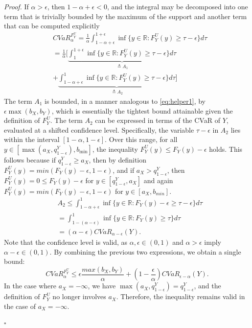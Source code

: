 \documentclass[letterpaper]{article} %
\newenvironment{proof}{\noindent\textit{Proof.}}{\hfill$\square$}
\begin{document}
\begin{proof}
	If $\alpha > \epsilon$, then $1 - \alpha + \epsilon < 0$, and the integral may be decomposed into one term that is trivially bounded by the maximum of the support and another term that can be computed explicitly
	\begin{equation}
		\begin{aligned}
			&CVaR_\alpha^{F_Y^U}=\frac{1}{\alpha}\int_{1-\alpha+\epsilon}^{1+\epsilon} \inf \{y\in \mathbb{R}:F_Y^U(y)\geq \tau -\epsilon\} d\tau \\
			&=\frac{1}{\alpha}[\underbrace{\int_{1}^{1+\epsilon} \inf \{y\in \mathbb{R}:F_Y^U(y)\geq \tau -\epsilon\} d\tau}_{\triangleq A_1} \\
			&+\underbrace{\int_{1-\alpha+\epsilon}^{1} \inf \{y\in \mathbb{R}:F_Y^U(y)\geq \tau -\epsilon\} d\tau}_{\triangleq A_2}]
		\end{aligned}
	\end{equation}
	The term $A_1$ is bounded, in a manner analogous to \eqref{eq:helper1}, by $\epsilon \max(b_X, b_Y)$, which is essentially the tightest bound attainable given the definition of $F_Y^U$. The term $A_2$ can be expressed in terms of the CVaR of $Y$, evaluated at a shifted confidence level. Specifically, the variable $\tau - \epsilon$ in $A_2$ lies within the interval $[1 - \alpha, 1 - \epsilon]$. Over this range, for all $y \in [\max(a_X, q_{1-\epsilon}^Y), b_{\min}]$, the inequality $F_Y^U(y) \leq F_Y(y) - \epsilon$ holds. This follows because if $q_{1-\epsilon}^Y \geq a_X$, then by definition $F_Y^U(y) = min(F_Y(y) - \epsilon, 1-\epsilon)$, and if $a_X > q_{1-\epsilon}^Y$, then $F_Y^U(y)=0 \leq F_Y(y) - \epsilon$ for $y\in [q_{1-\epsilon}^Y, a_X]$ and again $F_Y^U(y) = min(F_Y(y) - \epsilon, 1-\epsilon)$ for $y\in [a_X, b_{min}]$.
	\begin{equation}
		\begin{aligned}
			&A_2 \leq \int_{1-\alpha+\epsilon}^1 \inf \{y\in \mathbb{R}:F_Y(y) - \epsilon \geq \tau -\epsilon\}d\tau \\
			&=\int_{1-(\alpha-\epsilon)}^1 \inf \{y\in \mathbb{R}:F_Y(y) \geq \tau\}d\tau \\
			&=(\alpha-\epsilon)CVaR_{\alpha-\epsilon}(Y).
		\end{aligned}
	\end{equation}
	Note that the confidence level is valid, as $\alpha, \epsilon \in (0,1)$ and $\alpha > \epsilon$ imply $\alpha-\epsilon \in (0, 1)$. By combining the previous two expressions, we obtain a single bound:
	\begin{equation}
		CVaR_\alpha^{F_Y^U} \leq \epsilon\frac{max(b_X,b_Y)}{\alpha} + (1 - \frac{\epsilon}{\alpha})CVaR_{\epsilon-\alpha}(Y).
	\end{equation}
	In the case where $a_X = -\infty$, we have $\max(a_X, q_{1-\epsilon}^Y) = q_{1-\epsilon}^Y$, and the definition of $F_Y^U$ no longer involves $a_X$. Therefore, the inequality remains valid in the case of $a_X = -\infty$.
	

\end{proof}
\end{document}
